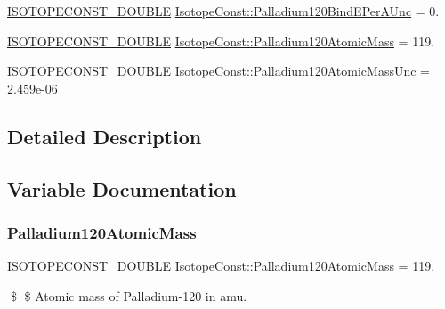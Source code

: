 \begin{DoxyCompactItemize}
\mbox{\hyperlink{group___isotope_const-_macros_ga8f45a7272ce02c0b4c65c44636ed719a}{I\+S\+O\+T\+O\+P\+E\+C\+O\+N\+S\+T\+\_\+\+D\+O\+U\+B\+LE}} \mbox{\hyperlink{group___isotope_const-_palladium-_pd120_ga0e965ed65e157ee0b2c6218ad7ff8606}{Isotope\+Const\+::\+Palladium120\+Bind\+E\+Per\+A\+Unc}} = 0.
\item 
\mbox{\hyperlink{group___isotope_const-_macros_ga8f45a7272ce02c0b4c65c44636ed719a}{I\+S\+O\+T\+O\+P\+E\+C\+O\+N\+S\+T\+\_\+\+D\+O\+U\+B\+LE}} \mbox{\hyperlink{group___isotope_const-_palladium-_pd120_gadac84d065052834c896a578427538313}{Isotope\+Const\+::\+Palladium120\+Atomic\+Mass}} = 119.
\item 
\mbox{\hyperlink{group___isotope_const-_macros_ga8f45a7272ce02c0b4c65c44636ed719a}{I\+S\+O\+T\+O\+P\+E\+C\+O\+N\+S\+T\+\_\+\+D\+O\+U\+B\+LE}} \mbox{\hyperlink{group___isotope_const-_palladium-_pd120_ga7eb9e9f35d5cf98c3f47356c24021fbb}{Isotope\+Const\+::\+Palladium120\+Atomic\+Mass\+Unc}} = 2.\+459e-\/06
\end{DoxyCompactItemize}


\subsection{Detailed Description}


\subsection{Variable Documentation}
\mbox{\label{group___isotope_const-_palladium-_pd120_gadac84d065052834c896a578427538313}} 
\subsubsection{\texorpdfstring{Palladium120\+Atomic\+Mass}{Palladium120AtomicMass}}
{\footnotesize\ttfamily \mbox{\hyperlink{group___isotope_const-_macros_ga8f45a7272ce02c0b4c65c44636ed719a}{I\+S\+O\+T\+O\+P\+E\+C\+O\+N\+S\+T\+\_\+\+D\+O\+U\+B\+LE}} Isotope\+Const\+::\+Palladium120\+Atomic\+Mass = 119.}

\$ \$ Atomic mass of Palladium-\/120 in amu. \mbox{\label{group___isotope_const-_palladium-_pd120_ga7eb9e9f35d5cf98c3f47356c24021fbb}} 
